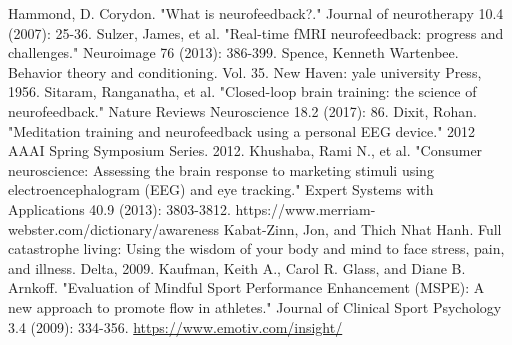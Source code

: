 \documentclass{llncs} %
\begin{document}
\begin{thebibliography}{[MT1]}
    Hammond, D. Corydon. "What is neurofeedback?." Journal of neurotherapy 10.4 (2007): 25-36.
    Sulzer, James, et al. "Real-time fMRI neurofeedback: progress and challenges." Neuroimage 76 (2013): 386-399.
    Spence, Kenneth Wartenbee. Behavior theory and conditioning. Vol. 35. New Haven: yale university Press, 1956.
    Sitaram, Ranganatha, et al. "Closed-loop brain training: the science of neurofeedback." Nature Reviews Neuroscience 18.2 (2017): 86.
    Dixit, Rohan. "Meditation training and neurofeedback using a personal EEG device." 2012 AAAI Spring Symposium Series. 2012.
    Khushaba, Rami N., et al. "Consumer neuroscience: Assessing the brain response to marketing stimuli using electroencephalogram (EEG) and eye tracking." Expert Systems with Applications 40.9 (2013): 3803-3812.
    https://www.merriam-webster.com/dictionary/awareness
    Kabat-Zinn, Jon, and Thich Nhat Hanh. Full catastrophe living: Using the wisdom of your body and mind to face stress, pain, and illness. Delta, 2009.
    Kaufman, Keith A., Carol R. Glass, and Diane B. Arnkoff. "Evaluation of Mindful Sport Performance Enhancement (MSPE): A new approach to promote flow in athletes." Journal of Clinical Sport Psychology 3.4 (2009): 334-356.
    \url{https://www.emotiv.com/insight/}
\end{thebibliography}
\end{document}
